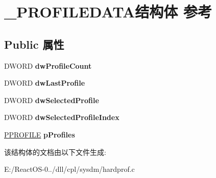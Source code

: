 \hypertarget{struct___p_r_o_f_i_l_e_d_a_t_a}{}\section{\+\_\+\+P\+R\+O\+F\+I\+L\+E\+D\+A\+T\+A结构体 参考}
\label{struct___p_r_o_f_i_l_e_d_a_t_a}
\subsection*{Public 属性}
\begin{DoxyCompactItemize}
\item 
\mbox{\label{struct___p_r_o_f_i_l_e_d_a_t_a_acfc8c11c36792d383d594d9ae29c831e}} 
D\+W\+O\+RD {\bfseries dw\+Profile\+Count}
\item 
\mbox{\label{struct___p_r_o_f_i_l_e_d_a_t_a_ab56578370bdbe288f0b65c319a858d1d}} 
D\+W\+O\+RD {\bfseries dw\+Last\+Profile}
\item 
\mbox{\label{struct___p_r_o_f_i_l_e_d_a_t_a_ad4e63215e5855777c66dfb5d9249a8b4}} 
D\+W\+O\+RD {\bfseries dw\+Selected\+Profile}
\item 
\mbox{\label{struct___p_r_o_f_i_l_e_d_a_t_a_ad6b73c994f7f21b768f9622cac407dac}} 
D\+W\+O\+RD {\bfseries dw\+Selected\+Profile\+Index}
\item 
\mbox{\label{struct___p_r_o_f_i_l_e_d_a_t_a_a2c78627f7e2ed125192f63a400fcf8a4}} 
\hyperlink{struct___p_r_o_f_i_l_e}{P\+P\+R\+O\+F\+I\+LE} {\bfseries p\+Profiles}
\end{DoxyCompactItemize}


该结构体的文档由以下文件生成\+:\begin{DoxyCompactItemize}
\item 
E\+:/\+React\+O\+S-\/0../dll/cpl/sysdm/hardprof.\+c\end{DoxyCompactItemize}
